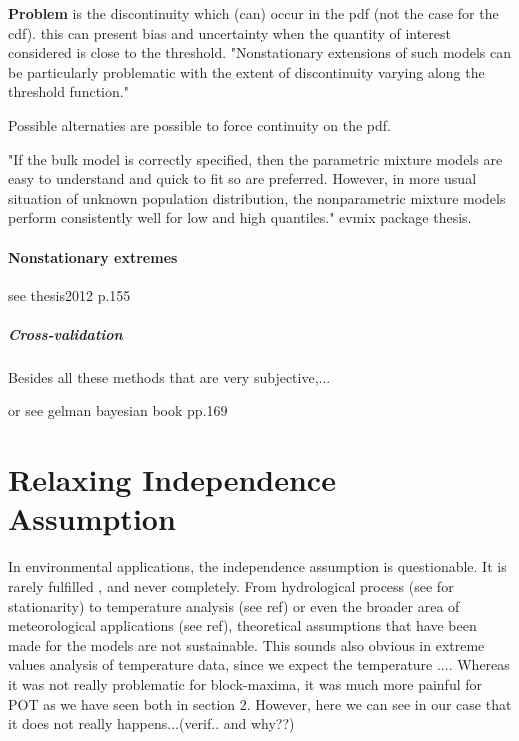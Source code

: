 \documentclass[11pt,a4paper,openany ]{book}
\begin{document}
\textbf{Problem} is the discontinuity which (can) occur in the pdf (not the case for the cdf). this can present bias and uncertainty when the quantity of interest considered is close to the threshold.
"Nonstationary extensions of such models can be particularly problematic
with the extent of discontinuity varying along the threshold function."

Possible alternaties are possible to force continuity on the pdf.

"If the bulk model is correctly specified, then the parametric
mixture models are easy to understand and quick to fit so are
preferred. However, in more usual situation of unknown
population distribution, the nonparametric mixture models
perform consistently well for low and high quantiles." evmix package thesis.


\subsubsection{Nonstationary extremes} see thesis2012 p.155

\paragraph{Cross-validation}
\cite{northrop_cross_2016} 
Besides all these methods that are very subjective,...

or see gelman bayesian book pp.169





\chapter{Relaxing Independence Assumption}\label{sec::3}
\minitoc\thispagestyle{empty}

In environmental applications, the independence assumption is questionable. It is rarely fulfilled \cite{}, and never completely. From hydrological process (see \citet{milly_stationarity_2008} for stationarity) to temperature analysis (see ref) or even the broader area of meteorological applications (see ref), theoretical assumptions that have been made for the models are not sustainable. This sounds also obvious in extreme values analysis of temperature data, since we expect the temperature .... Whereas it was not really problematic for block-maxima, it was much more painful for POT as we have seen  both in section 2. 
However, here we can see in our case that it does not really happens...(verif.. and why??)
\end{document}
